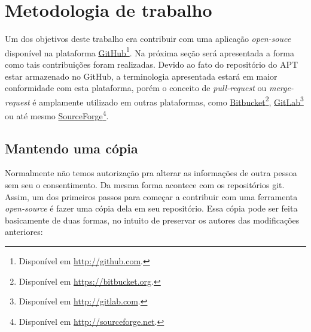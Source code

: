 \section{Metodologia de trabalho} %
\label{sec:contribuindo_com_plataformas_abertas}

Um dos objetivos deste trabalho era contribuir com uma aplicação \textit{open-souce} disponível na plataforma \href{http://github.com}{GitHub}\footnote{Disponível em \url{http://github.com}.}. Na próxima seção será apresentada a forma como tais contribuições foram realizadas. Devido ao fato do repositório do {\code APT} estar armazenado no GitHub, a terminologia apresentada estará em maior conformidade com esta plataforma, porém o conceito de \textit{pull-request} ou  \textit{merge-request} é amplamente utilizado em outras plataformas, como \href{https://bitbucket.org/}{Bitbucket}\footnote{Disponível em \url{https://bitbucket.org}.}, \href{https://gitlab.com/}{GitLab}\footnote{Disponível em \url{http://gitlab.com}.} ou até mesmo \href{http://sourceforge.net/}{SourceForge}\footnote{Disponível em \url{http://sourceforge.net}.}.


\subsection*{Mantendo uma cópia} %
\label{sub:mantendo_uma_copia_sua}


Normalmente não temos autorização pra alterar as informações de outra pessoa sem seu o consentimento. Da mesma forma  acontece com os repositórios {\code git}. Assim, um dos primeiros passos para começar a contribuir com uma ferramenta \textit{open-source} é fazer uma cópia dela em seu repositório. Essa cópia pode ser feita basicamente de duas formas, no intuito de preservar os autores das modificações anteriores:

